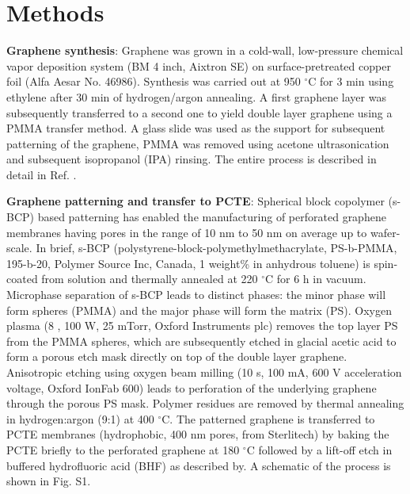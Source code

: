 \documentclass[journal=nalefd,email=true, hyperref=true, keywords=false]{achemso}
\newcommand{\Fig}{Fig.}
\begin{document}
\section{Methods}
\label{sec:methods}

\textbf{Graphene synthesis}: Graphene was grown in a cold-wall,
low-pressure chemical vapor deposition system (BM 4 inch, Aixtron SE)
on surface-pretreated copper foil (Alfa Aesar No. 46986). Synthesis was
carried out at 950 $^{\circ}$C for 3 min using ethylene after 30 min of
hydrogen/argon annealing. A first graphene layer was subsequently
transferred to a second one to yield double layer graphene using a
PMMA transfer method. A glass slide was used as the support for
subsequent patterning of the graphene, PMMA was removed using acetone
ultrasonication and subsequent isopropanol (IPA) rinsing. The entire
process is described in detail in Ref. .

\vspace{1em}
\noindent
\textbf{Graphene patterning and transfer to PCTE}: Spherical block
copolymer (s-BCP) based patterning has enabled the manufacturing of
perforated graphene membranes having pores in the range of 10 nm to 50
nm on average up to wafer-scale\cite{Choi_2018}. In brief, s-BCP
(polystyrene-block-polymethylmethacrylate, PS-b-PMMA, 195-b-20,
Polymer Source Inc, Canada, 1 weight\% in anhydrous toluene) is
spin-coated from solution and thermally annealed at 220 $^{\circ}$C
for 6 h in vacuum. Microphase separation of s-BCP leads to distinct
phases: the minor phase will form spheres (PMMA) and the major phase
will form the matrix (PS). Oxygen plasma (8 , 100 W, 25 mTorr, Oxford
Instruments plc) removes the top layer PS from the PMMA spheres, which
are subsequently etched in glacial acetic acid to form a porous
etch mask directly on top of the double layer graphene. Anisotropic
etching using oxygen beam milling (10 s, 100 mA, 600 V acceleration
voltage, Oxford IonFab 600) leads to perforation of the underlying
graphene through the porous PS mask. Polymer residues are removed by
thermal annealing in hydrogen:argon (9:1) at 400 $^{\circ}$C. The
patterned graphene is transferred to PCTE membranes (hydrophobic, 400
nm pores, from Sterlitech) by baking the PCTE briefly to the
perforated graphene at 180 $^{\circ}$C followed by a lift-off etch in
buffered hydrofluoric acid (BHF) as described by\cite{Choi_2018}. A
schematic of the process is shown in \Fig{} S1.
\end{document}
